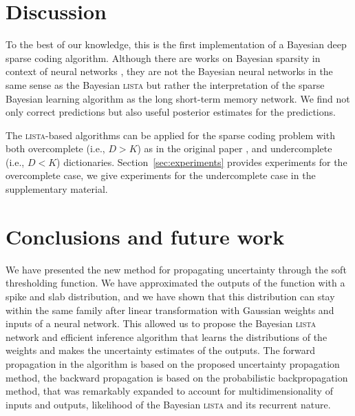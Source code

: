 \documentclass{article}
\begin{document}
\section{Discussion}
\label{sec:discussion}
To the best of our knowledge, this is the first implementation of a Bayesian deep sparse coding algorithm. Although there are works on Bayesian sparsity in context of neural networks \citep{he2017bayesian}, they are not the Bayesian neural networks in the same sense as the Bayesian \textsc{lista} but rather the interpretation of the sparse Bayesian  learning algorithm as the long short-term memory network. We find not only correct predictions but also useful posterior estimates for the predictions.


The \textsc{lista}-based algorithms can be applied for the sparse coding problem with both overcomplete (i.e., $D > K$) as in the original paper \citep{gregor2010learning}, and undercomplete (i.e., $D < K$) dictionaries. Section~\ref{sec:experiments} provides experiments for the overcomplete case, we give experiments for the undercomplete case in the supplementary material.

\section{Conclusions and future work}
\label{sec:conclusions}
We have presented the new method for propagating uncertainty through the soft thresholding function. %
We have approximated the outputs of the function with a spike and slab distribution, and we have shown that this distribution can stay within the same family after linear transformation with Gaussian weights and inputs of a neural network. This allowed us to propose the Bayesian \textsc{lista} network and efficient inference algorithm that learns the distributions of the weights and makes the uncertainty estimates of the outputs. The forward propagation in the algorithm is based on the proposed uncertainty propagation method, the backward propagation is based on the probabilistic backpropagation method, that was remarkably expanded to account for multidimensionality of inputs and outputs, likelihood of the Bayesian \textsc{lista} and its recurrent nature.
\end{document}
